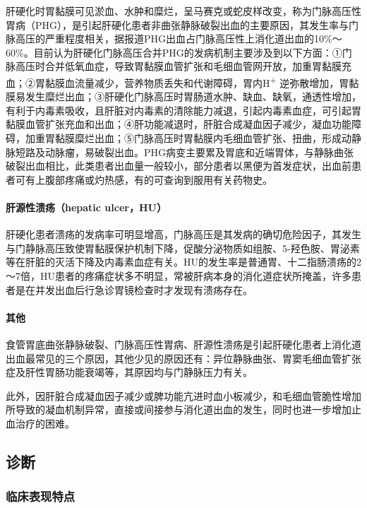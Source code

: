 肝硬化时胃黏膜可见淤血、水肿和糜烂，呈马赛克或蛇皮样改变，称为门脉高压性胃病（PHG），是引起肝硬化患者非曲张静脉破裂出血的主要原因，其发生率与门脉高压的严重程度相关，据报道PHG出血占门脉高压性上消化道出血的10\%～60\%。目前认为肝硬化门脉高压合并PHG的发病机制主要涉及到以下方面：①门脉高压时合并低氧血症，导致胃黏膜血管扩张和毛细血管网开放，加重胃黏膜充血；②胃黏膜血流量减少，营养物质丢失和代谢障碍，胃内H\textsuperscript{+}
逆弥散增加，胃黏膜易发生糜烂出血；③肝硬化门脉高压时胃肠道水肿、缺血、缺氧，通透性增加，有利于内毒素吸收，且肝脏对内毒素的清除能力减退，引起内毒素血症，可引起胃黏膜血管扩张充血和出血；④肝功能减退时，肝脏合成凝血因子减少，凝血功能障碍，加重胃黏膜糜烂出血；⑤门脉高压时胃黏膜内毛细血管扩张、扭曲，形成动静脉短路及动脉瘤，易破裂出血。PHG病变主要累及胃底和近端胃体，与静脉曲张破裂出血相比，此类患者出血量一般较小，部分患者以黑便为首发症状，出血前患者可有上腹部疼痛或灼热感，有的可查询到服用有关药物史。

\paragraph{肝源性溃疡（hepatic ulcer，HU）}

肝硬化患者溃疡的发病率可明显增高，门脉高压是其发病的确切危险因子，其发生与门静脉高压致使胃黏膜保护机制下降，促酸分泌物质如组胺、5-羟色胺、胃泌素等在肝脏的灭活下降及内毒素血症有关。HU的发生率是普通胃、十二指肠溃疡的2～7倍，HU患者的疼痛症状多不明显，常被肝病本身的消化道症状所掩盖，许多患者是在并发出血后行急诊胃镜检查时才发现有溃疡存在。

\paragraph{其他}

食管胃底曲张静脉破裂、门脉高压性胃病、肝源性溃疡是引起肝硬化患者上消化道出血最常见的三个原因，其他少见的原因还有：异位静脉曲张、胃窦毛细血管扩张症及肝性胃肠功能衰竭等，其原因均与门静脉压力有关。

此外，因肝脏合成凝血因子减少或脾功能亢进时血小板减少，和毛细血管脆性增加所导致的凝血机制异常，直接或间接参与消化道出血的发生，同时也进一步增加止血治疗的困难。

\subsection{诊断}

\subsubsection{临床表现特点}

